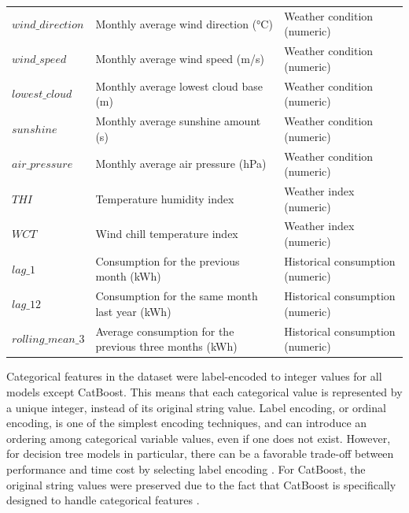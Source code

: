 \begin{table}[h!tbp]
\begin{tabularx}{\linewidth}{l L l}
        $wind\_direction$      & Monthly average wind direction (\unit{\degreeCelsius})  & Weather condition (numeric)         \\
        $wind\_speed$          & Monthly average wind speed (m/s)                        & Weather condition (numeric)         \\
        $lowest\_cloud$        & Monthly average lowest cloud base (m)                   & Weather condition (numeric)         \\
        $sunshine$             & Monthly average sunshine amount (s)                     & Weather condition (numeric)         \\
        $air\_pressure$        & Monthly average air pressure (hPa)                      & Weather condition (numeric)         \\
        $THI$                  & Temperature humidity index                              & Weather index (numeric)             \\
        $WCT$                  & Wind chill temperature index                            & Weather index (numeric)             \\
        \midrule
        $lag\_1$               & Consumption for the previous month (kWh)                & Historical consumption (numeric)    \\
        $lag\_12$              & Consumption for the same month last year (kWh)          & Historical consumption (numeric)    \\
        $rolling\_mean\_3$     & Average consumption for the previous three months (kWh) & Historical consumption (numeric)    \\
    \end{tabularx}
\end{table}

\FloatBarrier

Categorical features in the dataset were label-encoded to integer values for all models except CatBoost. This means that each categorical value is represented by a unique integer, instead of its original string value. Label encoding, or ordinal encoding, is one of the simplest encoding techniques, and can introduce an ordering among categorical variable values, even if one does not exist. However, for decision tree models in particular, there can be a favorable trade-off between performance and time cost by selecting label encoding \cite{zhu_comparative_2024}. For CatBoost, the original string values were preserved due to the fact that CatBoost is specifically designed to handle categorical features \cite{prokhorenkova_catboost_2018}.

